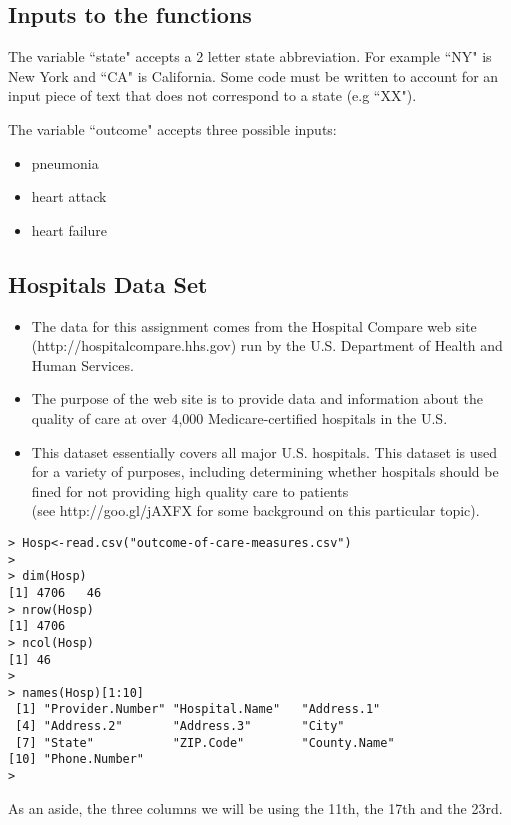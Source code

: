 \documentclass[]{article}
\begin{document}
\subsection{Inputs to the functions}
The variable ``state" accepts a 2 letter state abbreviation. For example ``NY" is New York and ``CA" is California. Some code must be written to account for an input piece of text that does not correspond to a state (e.g ``XX").

\noindent The variable ``outcome" accepts three possible inputs:
\begin{itemize}
\item pneumonia
\item heart attack
\item heart failure
\end{itemize}


\subsection{Hospitals Data Set}
\begin{itemize}
\item The data for this assignment comes from the Hospital Compare web site (http://hospitalcompare.hhs.gov)
run by the U.S. Department of Health and Human Services.
\item  The purpose of the web site is to provide data and
information about the quality of care at over 4,000 Medicare-certified hospitals in the U.S. 
\item This dataset essentially covers all major U.S. hospitals. This dataset is used for a variety of purposes, including determining
whether hospitals should be fined for not providing high quality care to patients \\ (see http://goo.gl/jAXFX
for some background on this particular topic).
\end{itemize}

\begin{verbatim}
> Hosp<-read.csv("outcome-of-care-measures.csv")
>
> dim(Hosp)
[1] 4706   46
> nrow(Hosp)
[1] 4706
> ncol(Hosp)
[1] 46
>
> names(Hosp)[1:10]
 [1] "Provider.Number" "Hospital.Name"   "Address.1"      
 [4] "Address.2"       "Address.3"       "City"           
 [7] "State"           "ZIP.Code"        "County.Name"    
[10] "Phone.Number"   
>
\end{verbatim}

As an aside, the three columns we will be using the 11th, the 17th and the 23rd.
\end{document}

